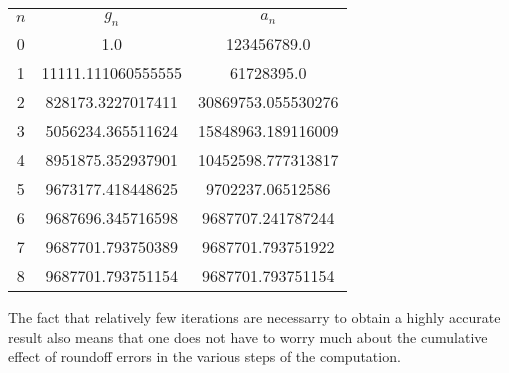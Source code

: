 \documentclass[12pt]{article}
\begin{document}
\begin{tabular}
{c|c|c}
$n$ & $g_n$ & $a_n$ \\
0 & 1.0 & 123456789.0 \\
1 & 11111.111060555555 & 61728395.0 \\
2 & 828173.3227017411 & 30869753.055530276 \\
3 & 5056234.365511624 & 15848963.189116009 \\
4 & 8951875.352937901 & 10452598.777313817 \\
5 & 9673177.418448625 & 9702237.06512586 \\
6 & 9687696.345716598 & 9687707.241787244 \\
7 & 9687701.793750389 & 9687701.793751922 \\
8 & 9687701.793751154 & 9687701.793751154
\end{tabular}

The fact that relatively few iterations are necessarry to obtain a highly
accurate result also means that one does not have to worry much about the 
cumulative effect of roundoff errors in the various steps of the computation.
\end{document}
